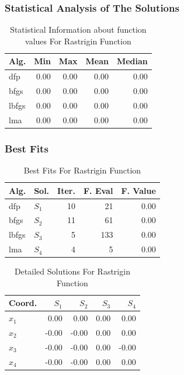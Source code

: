 \documentclass[conference]{IEEEtran}
\begin{document}
\subsubsection{Statistical Analysis of The Solutions}
\label{statisticalanalysisrastrigin4d4D}

\begin{table}[H]
\centering
\caption{Statistical Information about function values For Rastrigin Function}
\label{function_values:rastrigin4d}
\begin{tabular}{lrrrr}
\toprule
 Alg. &  Min &  Max &  Mean &  Median \\
\midrule
  dfp & 0.00 & 0.00 &  0.00 &    0.00 \\
 bfgs & 0.00 & 0.00 &  0.00 &    0.00 \\
lbfgs & 0.00 & 0.00 &  0.00 &    0.00 \\
  lma & 0.00 & 0.00 &  0.00 &    0.00 \\
\bottomrule
\end{tabular}
\end{table}

\subsubsection{Best Fits}
\label{bestfitsrastrigin4d4D}

\begin{table}[H]
\centering
\caption{Best Fits For Rastrigin Function}
\label{solutions:rastrigin4d}
\begin{tabular}{llrrr}
\toprule
 Alg. &    Sol. &  Iter. &  F. Eval &  F. Value \\
\midrule
  dfp & $S_{1}$ &     10 &       21 &      0.00 \\
 bfgs & $S_{2}$ &     11 &       61 &      0.00 \\
lbfgs & $S_{3}$ &      5 &      133 &      0.00 \\
  lma & $S_{4}$ &      4 &        5 &      0.00 \\
\bottomrule
\end{tabular}
\end{table}

\begin{table}[H]
\centering
\caption{Detailed Solutions For Rastrigin Function}
\label{detailedsolutions:rastrigin4d}
\begin{tabular}{lrrrr}
\toprule
 Coord. &  $S_{1}$ &  $S_{2}$ &  $S_{3}$ &  $S_{4}$ \\
\midrule
$x_{1}$ &     0.00 &     0.00 &     0.00 &     0.00 \\
$x_{2}$ &    -0.00 &    -0.00 &     0.00 &     0.00 \\
$x_{3}$ &    -0.00 &    -0.00 &     0.00 &    -0.00 \\
$x_{4}$ &    -0.00 &    -0.00 &     0.00 &     0.00 \\
\bottomrule
\end{tabular}
\end{table}
\end{document}
